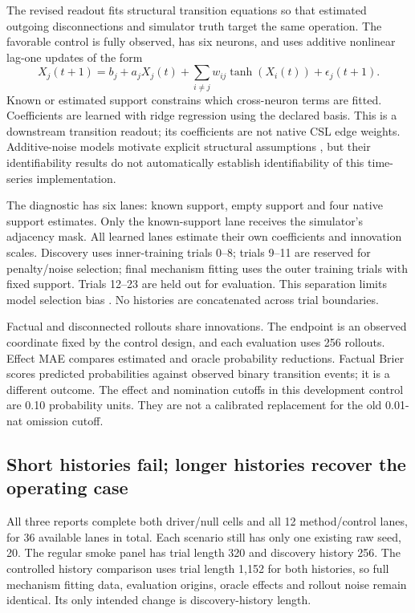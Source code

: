 \documentclass[11pt,a4paper]{article}
\begin{document}
The revised readout fits structural transition equations so that estimated
outgoing disconnections and simulator truth target the same operation. The favorable
control is fully observed, has six neurons, and uses additive nonlinear lag-one
updates of the form
\begin{equation}
 X_j(t+1)=b_j+a_jX_j(t)+
 \sum_{i\ne j}w_{ij}\tanh\!\left(X_i(t)\right)+\epsilon_j(t+1).
 \label{eq:scm}
\end{equation}
Known or estimated support constrains which cross-neuron terms are fitted.
Coefficients are learned with ridge regression \citep{hoerl1970ridge} using the
declared basis. This is a downstream transition readout; its coefficients are not
native CSL edge weights. Additive-noise models motivate explicit structural
assumptions \citep{peters2014additive}, but their identifiability results do not
automatically establish identifiability of this time-series implementation.

The diagnostic has six lanes: known support, empty support and four native support
estimates. Only the known-support lane receives the simulator's adjacency mask.
All learned lanes estimate their own coefficients and innovation scales. Discovery
uses inner-training trials 0--8; trials 9--11 are reserved for penalty/noise
selection; final mechanism fitting uses the outer training trials with fixed
support. Trials 12--23 are held out for evaluation. This separation limits model
selection bias \citep{cawley2010overfitting}. No histories are concatenated across
trial boundaries.

Factual and disconnected rollouts share innovations. The endpoint is an observed
coordinate fixed by the control design, and each evaluation uses 256 rollouts.
Effect MAE compares estimated and oracle probability reductions. Factual Brier
scores predicted probabilities against observed binary transition events; it is a
different outcome. The effect and nomination cutoffs in this development control
are 0.10 probability units. They are not a calibrated replacement for the old
0.01-nat omission cutoff.

\subsection{Short histories fail; longer histories recover the operating case}

All three reports complete both driver/null cells and all 12 method/control lanes,
for 36 available lanes in total. Each scenario still has only one existing raw
seed, 20. The regular smoke panel has trial length 320 and discovery history 256.
The controlled history comparison uses trial length 1,152 for both histories, so
full mechanism fitting data, evaluation origins, oracle effects and rollout noise
remain identical. Its only intended change is discovery-history length.
\end{document}
